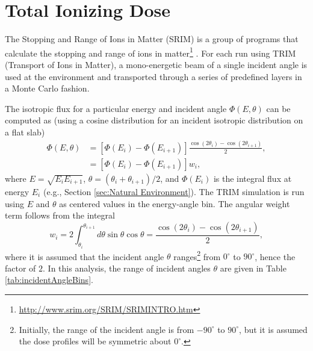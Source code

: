 \documentclass{hitec}
\begin{document}
\section{Total Ionizing Dose}

The Stopping and Range of Ions in Matter (SRIM) is a group of programs that calculate the stopping and range of ions in matter\footnote{\url{http://www.srim.org/SRIM/SRIMINTRO.htm}} \citep{ziegler2004srim, ziegler2010srim}. %
For each run using TRIM (Transport of Ions in Matter), a mono-energetic beam of a single incident angle is used at the environment and transported through a series of predefined layers in a Monte Carlo fashion.

The isotropic flux for a particular energy and incident angle $\Phi(E,\theta)$ can be computed as (using a cosine distribution for an incident isotropic distribution on a flat slab)
\begin{align}
	\Phi(E,\theta) &= [\Phi(E_i) - \Phi(E_{i+1})] \frac{\cos(2\theta_i) - \cos(2\theta_{i+1})}{2},\nonumber\\
	&= [\Phi(E_i) - \Phi(E_{i+1})] w_i,
\end{align}
where $E = \sqrt{E_i E_{i+1}}$, $\theta = (\theta_i + \theta_{i+1})/2$, and $\Phi(E_i)$ is the integral flux at energy $E_i$ (e.g., Section \ref{sec:Natural Environment}). The TRIM simulation is run using $E$ and $\theta$ as centered values in the energy-angle bin. The angular weight term follows from the integral
\begin{equation}
	w_i = 2\int_{\theta_i}^{\theta_{i+1}}d\theta\sin\theta\cos\theta = \frac{\cos(2\theta_i) - \cos(2\theta_{i+1})}{2},
\end{equation}
where it is assumed that the incident angle $\theta$ ranges\footnote{Initially, the range of the incident angle is from $-90^\circ$ to $90^\circ$, but it is assumed the dose profiles will be symmetric about $0^\circ$.} from $0^\circ$ to $90^\circ$, hence the factor of $2$. In this analysis, the range of incident angles $\theta$ are given in Table \ref{tab:incidentAngleBins}.
\end{document}
